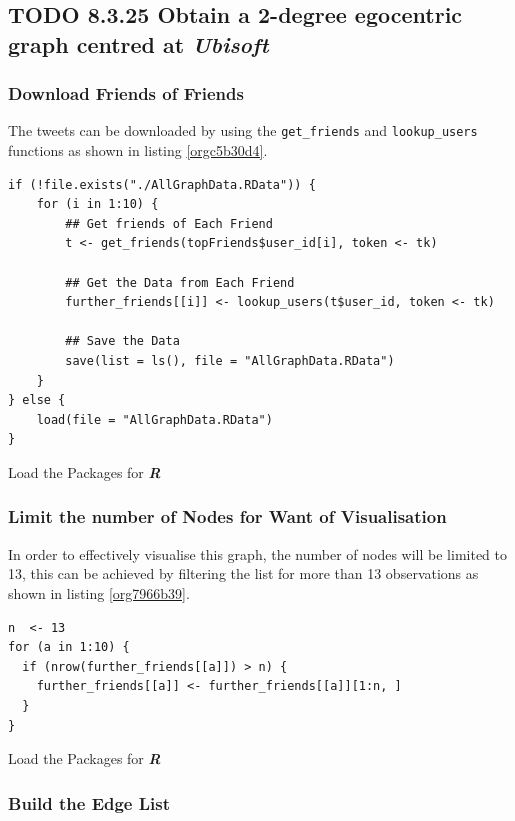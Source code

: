 \documentclass[11pt]{article}
\begin{document}
\subsection{{\bfseries\sffamily TODO} 8.3.25 Obtain a \textbf{2-degree} egocentric graph centred at \emph{Ubisoft}}
\label{sec:orgdb343c8}
\subsubsection{Download Friends of Friends}
\label{sec:org7d02af4}

The tweets can be downloaded by using the \texttt{get\_friends} and \texttt{lookup\_users}
functions as shown in listing \ref{orgc5b30d4}.

\begin{listing}[htbp]
\begin{verbatim}
if (!file.exists("./AllGraphData.RData")) {
    for (i in 1:10) {
        ## Get friends of Each Friend
        t <- get_friends(topFriends$user_id[i], token <- tk)

        ## Get the Data from Each Friend
        further_friends[[i]] <- lookup_users(t$user_id, token <- tk)

        ## Save the Data
        save(list = ls(), file = "AllGraphData.RData")
    }
} else {
    load(file = "AllGraphData.RData")
}

\end{verbatim}
\caption{\label{orgc5b30d4}Load the Packages for \textbf{\textbf{\emph{R}}}}
\end{listing}

\subsubsection{Limit the number of Nodes for Want of Visualisation}
\label{sec:org45717a5}
In order to effectively visualise this graph, the number of nodes will be limited to 13, this can be achieved by filtering the list for more than 13 observations as shown in listing \ref{org7966b39}.

\begin{listing}[htbp]
\begin{verbatim}
n  <- 13
for (a in 1:10) {
  if (nrow(further_friends[[a]]) > n) {
    further_friends[[a]] <- further_friends[[a]][1:n, ]
  }
}
\end{verbatim}
\caption{\label{org7966b39}Load the Packages for \textbf{\textbf{\emph{R}}}}
\end{listing}

\subsubsection{Build the Edge List}
\label{sec:org9db0401}
\end{document}
